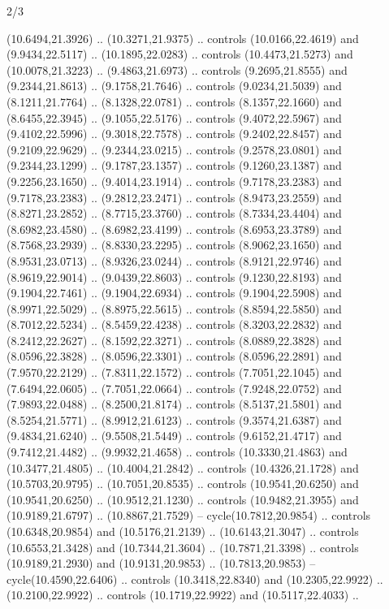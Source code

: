 \begin{flagdescription}{2/3}
\begin{scope}[yshift=\flagwidth,scale=\flagwidth/1241.93737]
\begin{scope}[y=-1mm, x=1mm,draw=gold,fill=blue,line join=miter,miter limit=4,line width=1.8\lw]
{  (10.6494,21.3926) .. (10.3271,21.9375) .. controls (10.0166,22.4619) and
  (9.9434,22.5117) .. (10.1895,22.0283) .. controls (10.4473,21.5273) and
  (10.0078,21.3223) .. (9.4863,21.6973) .. controls (9.2695,21.8555) and
  (9.2344,21.8613) .. (9.1758,21.7646) .. controls (9.0234,21.5039) and
  (8.1211,21.7764) .. (8.1328,22.0781) .. controls (8.1357,22.1660) and
  (8.6455,22.3945) .. (9.1055,22.5176) .. controls (9.4072,22.5967) and
  (9.4102,22.5996) .. (9.3018,22.7578) .. controls (9.2402,22.8457) and
  (9.2109,22.9629) .. (9.2344,23.0215) .. controls (9.2578,23.0801) and
  (9.2344,23.1299) .. (9.1787,23.1357) .. controls (9.1260,23.1387) and
  (9.2256,23.1650) .. (9.4014,23.1914) .. controls (9.7178,23.2383) and
  (9.7178,23.2383) .. (9.2812,23.2471) .. controls (8.9473,23.2559) and
  (8.8271,23.2852) .. (8.7715,23.3760) .. controls (8.7334,23.4404) and
  (8.6982,23.4580) .. (8.6982,23.4199) .. controls (8.6953,23.3789) and
  (8.7568,23.2939) .. (8.8330,23.2295) .. controls (8.9062,23.1650) and
  (8.9531,23.0713) .. (8.9326,23.0244) .. controls (8.9121,22.9746) and
  (8.9619,22.9014) .. (9.0439,22.8603) .. controls (9.1230,22.8193) and
  (9.1904,22.7461) .. (9.1904,22.6934) .. controls (9.1904,22.5908) and
  (8.9971,22.5029) .. (8.8975,22.5615) .. controls (8.8594,22.5850) and
  (8.7012,22.5234) .. (8.5459,22.4238) .. controls (8.3203,22.2832) and
  (8.2412,22.2627) .. (8.1592,22.3271) .. controls (8.0889,22.3828) and
  (8.0596,22.3828) .. (8.0596,22.3301) .. controls (8.0596,22.2891) and
  (7.9570,22.2129) .. (7.8311,22.1572) .. controls (7.7051,22.1045) and
  (7.6494,22.0605) .. (7.7051,22.0664) .. controls (7.9248,22.0752) and
  (7.9893,22.0488) .. (8.2500,21.8174) .. controls (8.5137,21.5801) and
  (8.5254,21.5771) .. (8.9912,21.6123) .. controls (9.3574,21.6387) and
  (9.4834,21.6240) .. (9.5508,21.5449) .. controls (9.6152,21.4717) and
  (9.7412,21.4482) .. (9.9932,21.4658) .. controls (10.3330,21.4863) and
  (10.3477,21.4805) .. (10.4004,21.2842) .. controls (10.4326,21.1728) and
  (10.5703,20.9795) .. (10.7051,20.8535) .. controls (10.9541,20.6250) and
  (10.9541,20.6250) .. (10.9512,21.1230) .. controls (10.9482,21.3955) and
  (10.9189,21.6797) .. (10.8867,21.7529) -- cycle(10.7812,20.9854) .. controls
  (10.6348,20.9854) and (10.5176,21.2139) .. (10.6143,21.3047) .. controls
  (10.6553,21.3428) and (10.7344,21.3604) .. (10.7871,21.3398) .. controls
  (10.9189,21.2930) and (10.9131,20.9853) .. (10.7813,20.9853) --
  cycle(10.4590,22.6406) .. controls (10.3418,22.8340) and (10.2305,22.9922) ..
  (10.2100,22.9922) .. controls (10.1719,22.9922) and (10.5117,22.4033) ..
}
\end{scope}
\end{scope}
\end{flagdescription}
